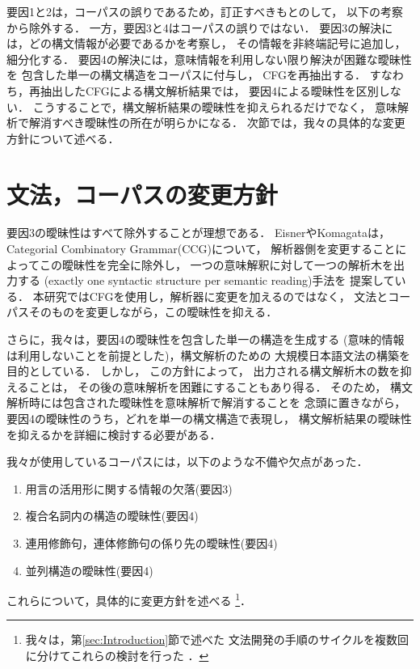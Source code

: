 要因1と2は，コーパスの誤りであるため，訂正すべきもとのして，
以下の考察から除外する．
一方，要因3と4はコーパスの誤りではない．
要因3の解決には，どの構文情報が必要であるかを考察し，
その情報を非終端記号に追加し，細分化する．
要因4の解決には，意味情報を利用しない限り解決が困難な曖昧性を
包含した単一の構文構造をコーパスに付与し，
CFGを再抽出する．
すなわち，再抽出したCFGによる構文解析結果では，
要因4による曖昧性を区別しない．
こうすることで，構文解析結果の曖昧性を抑えられるだけでなく，
意味解析で解消すべき曖昧性の所在が明らかになる．
次節では，我々の具体的な変更方針について述べる．

\section{文法，コーパスの変更方針}
\label{sec:Modification}




\label{sec:Policy}

要因3の曖昧性はすべて除外することが理想である．
EisnerやKomagataは，Categorial Combinatory Grammar(CCG)について，
解析器側を変更することによってこの曖昧性を完全に除外し，
一つの意味解釈に対して一つの解析木を出力する
(exactly one syntactic structure per semantic reading)手法を
提案している\cite{eisner:1996,komagata:97b}．
本研究ではCFGを使用し，解析器に変更を加えるのではなく，
文法とコーパスそのものを変更しながら，この曖昧性を抑える．

さらに，我々は，要因4の曖昧性を包含した単一の構造を生成する
(意味的情報は利用しないことを前提とした)，構文解析のための
大規模日本語文法の構築を目的としている．
しかし，
この方針によって，
出力される構文解析木の数を抑えることは，
その後の意味解析を困難にすることもあり得る．
そのため，
構文解析時には包含された曖昧性を意味解析で解消することを
念頭に置きながら，
要因4の曖昧性のうち，どれを単一の構文構造で表現し，
構文解析結果の曖昧性を抑えるかを詳細に検討する必要がある．

我々が使用しているコーパスには，以下のような不備や欠点があった．
\begin{enumerate}
\item 用言の活用形に関する情報の欠落(要因3)
\item 複合名詞内の構造の曖昧性(要因4)
\item 連用修飾句，連体修飾句の係り先の曖昧性(要因4)
\item 並列構造の曖昧性(要因4)
\end{enumerate}
これらについて，具体的に変更方針を述べる
\footnote{我々は，第\ref{sec:Introduction}節で述べた
文法開発の手順のサイクルを複数回に分けてこれらの検討を行った
\cite{noro:2003}．}．

